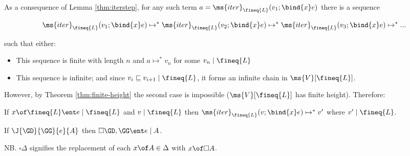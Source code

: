 \documentclass{article}
\newcommand{\ale}{\sqsubseteq}
\newcommand{\iter}[4]{\ms{iter}_{#1}({#2}; \bind{#3}#4)}
\newcommand{\step}{\mapsto}
\newcommand{\steps}{\step^*}
\newcommand{\disc}[1]{\square{#1}}
\newcommand{\lr}[2]{#2\mathrel{|}#1}
\newcommand{\lrcx}[3]{#1 \ent \lr{#2}{#3}}
\newcommand{\Val}[1]{\ms{V}[#1]}
\begin{document}
As a consequence of Lemma \ref{thm:iterstep}, for any such term $a =
\iter{\fineq{L}}{v_1}{x}{e}$ there is a sequence

\[ \iter{\fineq{L}}{v_1}{x}{e} \steps
\iter{\fineq{L}}{v_2}{x}{e} \steps
\iter{\fineq{L}}{v_3}{x}{e} \steps ... \]

such that either:
\begin{itemize}
\item This sequence is finite with length $n$ and $a \steps v_n$ for some
  $\lr{\fineq{L}}{v_n}$
\item This sequence is infinite; and since $\lr{\fineq{L}}{v_i \ale v_{i+1}}$,
  it forms an infinite chain in $\Val{\fineq{L}}$.
\end{itemize}

However, by Theorem \ref{thm:finite-height} the second case is impossible
($\Val{\fineq{L}}$ has finite height). Therefore:
\begin{theorem}
  If $\lrcx{x \of \fineq{L}}{\fineq{L}}{e}$ and $\lr{\fineq{L}}{v}$ then
  $\iter{\fineq{L}}{v}{x}{e} \steps v'$ where $\lr{\fineq{L}}{v'}$.
\end{theorem}


\newcommand{\cxdisc}[1]{\disc{#1}}

\begin{theorem}
  If $\J{\GD}{\GG}{e}{A}$ then $\lrcx{\cxdisc{\GD},\GG}{A}{e}$.
\end{theorem}

NB. $\cxdisc{\Delta}$ signifies the replacement of each $x \of A \in \Delta$
with $x \of \disc{A}$.
\end{document}
